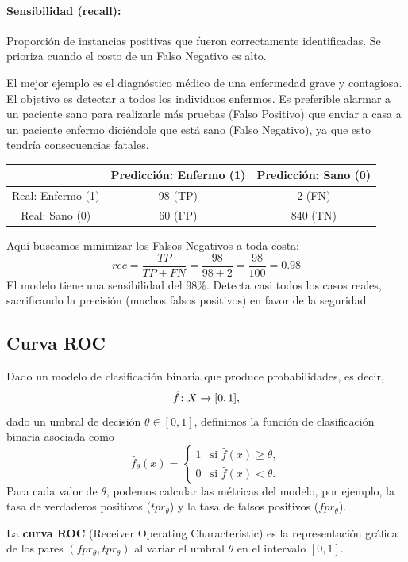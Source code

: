 \documentclass[a4,11pt]{aleph-notas}
\begin{document}
\paragraph{Sensibilidad (recall):} Proporción de instancias positivas que fueron correctamente identificadas. Se prioriza cuando el costo de un Falso Negativo es alto.

El mejor ejemplo es el diagnóstico médico de una enfermedad grave y contagiosa. El objetivo es detectar a todos los individuos enfermos. Es preferible alarmar a un paciente sano para realizarle más pruebas (Falso Positivo) que enviar a casa a un paciente enfermo diciéndole que está sano (Falso Negativo), ya que esto tendría consecuencias fatales.

\begin{center}\small
\begin{tabular}{c|c|c}
    & Predicción: Enfermo (1) & Predicción: Sano (0) \\
    \hline
    Real: Enfermo (1) & 98 (TP) & {2 (FN)} \\
    \hline
    Real: Sano (0) & 60 (FP) & 840 (TN) \\
\end{tabular}
\end{center}
Aquí buscamos minimizar los Falsos Negativos a toda costa:
\[rec = \frac{TP}{TP + FN} = \frac{98}{98 + 2} = \frac{98}{100} = 0.98\]
El modelo tiene una sensibilidad del 98\%. Detecta casi todos los casos reales, sacrificando la precisión (muchos falsos positivos) en favor de la seguridad.

\subsection{Curva ROC}

Dado un modelo de clasificación binaria que produce probabilidades, es decir,
\[
\hat{f}\colon X \rightarrow [0,1],
\]
dado un umbral de decisión $\theta \in [0,1]$, definimos la función de clasificación binaria asociada como
\[
\hat{f}_\theta(x) = \begin{cases}
1 & \text{si } \hat{f}(x) \geq \theta, \\
0 & \text{si } \hat{f}(x) < \theta.
\end{cases}
\]
Para cada valor de $\theta$, podemos calcular las métricas del modelo, por ejemplo, la tasa de verdaderos positivos ($tpr_\theta$) y la tasa de falsos positivos ($fpr_\theta$).

\begin{defi}
    La \textbf{curva ROC} (Receiver Operating Characteristic) es la representación gráfica de los pares $(fpr_\theta, tpr_\theta)$ al variar el umbral $\theta$ en el intervalo $[0,1]$.
\end{defi}
\end{document}
